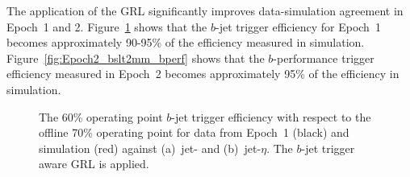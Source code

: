 The application of the GRL significantly improves data-simulation agreement in Epoch~1 and 2.
Figure~\ref{fig:Epoch1_bslt2mm_eff} shows that the $b$-jet trigger efficiency for Epoch~1 becomes approximately 90-95\% of the efficiency measured in simulation.
Figure~\ref{fig:Epoch2_bslt2mm_bperf} shows that the \mbox{$b$-performance} trigger efficiency measured in Epoch~2 becomes approximately 95\% of the efficiency in simulation.

\begin{figure}[!htb]
  \begin{center}
    \captionsetup[subfigure]{aboveskip=0pt,justification=centering}
  \end{center}
\vspace{-1em}
  \caption[
  The $b$-jet trigger efficiency for data from Epoch~2 and for simulated events.
  The $b$-jet trigger aware GRL is applied.
]
        {The 60\% operating point $b$-jet trigger efficiency with respect to the offline 70\% operating point
    for data from Epoch~1 (black) and simulation (red) against (a)~jet-\pT{} and (b)~jet-$\eta$.
    The $b$-jet trigger aware GRL is applied.}
  \label{fig:Epoch1_bslt2mm_eff}
  \begin{center}
    \captionsetup[subfigure]{aboveskip=0pt,justification=centering}

\end{center}
\end{figure}
